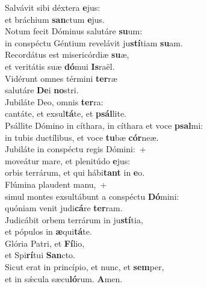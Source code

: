 \evenverse Salvávit sibi déxtera \textbf{e}jus:~\*\\
\evenverse et bráchium \textbf{san}ctum \textbf{e}jus.\\
\oddverse Notum fecit Dóminus salutáre \textbf{su}um:~\*\\
\oddverse in conspéctu Géntium revelávit ju\textbf{stí}tiam \textbf{su}am.\\
\evenverse Recordátus est misericórdiæ \textbf{su}æ,~\*\\
\evenverse et veritátis suæ \textbf{dó}mui \textbf{Is}raël.\\
\oddverse Vidérunt omnes términi \textbf{ter}ræ~\*\\
\oddverse salutáre \textbf{De}i \textbf{no}stri.\\
\evenverse Jubiláte Deo, omnis \textbf{ter}ra:~\*\\
\evenverse cantáte, et exsul\textbf{tá}te, et \textbf{psál}lite.\\
\oddverse Psállite Dómino in cíthara, in cíthara et voce \textbf{psal}mi:~\*\\
\oddverse in tubis ductílibus, et voce \textbf{tu}bæ \textbf{cór}neæ.\\
\evenverse Jubiláte in conspéctu regis Dómini:~+\\
\evenverse  moveátur mare, et plenitúdo \textbf{e}jus:~\*\\
\evenverse orbis terrárum, et qui hábi\textbf{tant} in \textbf{e}o.\\
\oddverse Flúmina plaudent manu,~+\\
\oddverse  simul montes exsultábunt a conspéctu \textbf{Dó}mini:~\*\\
\oddverse quóniam venit judi\textbf{cá}re \textbf{ter}ram.\\
\evenverse Judicábit orbem terrárum in ju\textbf{stí}tia,~\*\\
\evenverse et pópulos in \textbf{æ}qui\textbf{tá}te.\\
\oddverse Glória Patri, et \textbf{Fí}lio,~\*\\
\oddverse et Spi\textbf{rí}tui \textbf{San}cto.\\
\evenverse Sicut erat in princípio, et nunc, et \textbf{sem}per,~\*\\
\evenverse et in sǽcula sæcu\textbf{ló}rum. \textbf{A}men.\\

